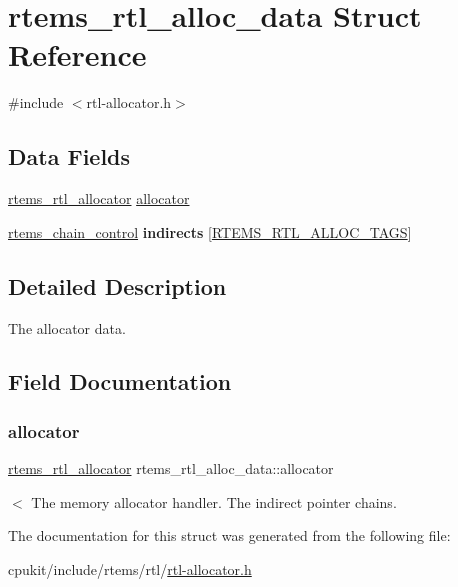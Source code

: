 \hypertarget{structrtems__rtl__alloc__data}{}\section{rtems\+\_\+rtl\+\_\+alloc\+\_\+data Struct Reference}
\label{structrtems__rtl__alloc__data}


{\ttfamily \#include $<$rtl-\/allocator.\+h$>$}

\subsection*{Data Fields}
\begin{DoxyCompactItemize}
\item 
\mbox{\hyperlink{rtl-allocator_8h_aa8af44a7337cfbfe72b669c82a604bb7}{rtems\+\_\+rtl\+\_\+allocator}} \mbox{\hyperlink{structrtems__rtl__alloc__data_a1ff05d643c32853a0fa8fabf32a51547}{allocator}}
\item 
\mbox{\label{structrtems__rtl__alloc__data_adcc3ba567617655feaeed4ecc55d0655}} 
\mbox{\hyperlink{unionChain__Control}{rtems\+\_\+chain\+\_\+control}} {\bfseries indirects} \mbox{[}\mbox{\hyperlink{rtl-allocator_8h_a54535608b5611dda0d9f501ac2237b9c}{R\+T\+E\+M\+S\+\_\+\+R\+T\+L\+\_\+\+A\+L\+L\+O\+C\+\_\+\+T\+A\+GS}}\mbox{]}
\end{DoxyCompactItemize}


\subsection{Detailed Description}
The allocator data. 

\subsection{Field Documentation}
\mbox{\label{structrtems__rtl__alloc__data_a1ff05d643c32853a0fa8fabf32a51547}} 
\subsubsection{\texorpdfstring{allocator}{allocator}}
{\footnotesize\ttfamily \mbox{\hyperlink{rtl-allocator_8h_aa8af44a7337cfbfe72b669c82a604bb7}{rtems\+\_\+rtl\+\_\+allocator}} rtems\+\_\+rtl\+\_\+alloc\+\_\+data\+::allocator}

$<$ The memory allocator handler. The indirect pointer chains. 

The documentation for this struct was generated from the following file\+:\begin{DoxyCompactItemize}
\item 
cpukit/include/rtems/rtl/\mbox{\hyperlink{rtl-allocator_8h}{rtl-\/allocator.\+h}}\end{DoxyCompactItemize}
